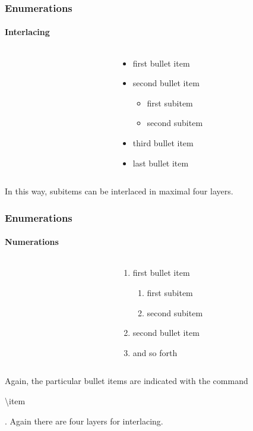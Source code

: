 \begin{frame}
\frametitle{Enumerations}
\framesubtitle{Interlacing}

\begin{columns}
\begin{column}{.5\textwidth}
\begin{ttfamily}

\end{ttfamily}
\end{column}
\begin{column}{.5\textwidth}
\begin{itemize}
\item first bullet item
\item second bullet item
\begin{itemize}
\item first subitem
\item second subitem
\end{itemize}
\item third bullet item
\item last bullet item
\end{itemize}
\end{column}
\end{columns}
\bigskip
In this way, subitems can be interlaced in maximal four layers.
\end{frame}


\begin{frame}
\frametitle{Enumerations}
\framesubtitle{Numerations}

\begin{columns}
\begin{column}{.5\textwidth}
\begin{ttfamily}

\end{ttfamily}
\end{column}
\begin{column}{.5\textwidth}
\begin{enumerate}
\item first bullet item
\begin{enumerate}
\item first subitem
\item second subitem
\end{enumerate}
\item second bullet item
\item and so forth
\end{enumerate}
\end{column}
\end{columns}
\bigskip
Again, the particular bullet items are indicated with the command \begin{ttfamily}\color{nounibaredI}\textbackslash item\color{black}\end{ttfamily}. 
Again there are four layers for interlacing.
\end{frame}

